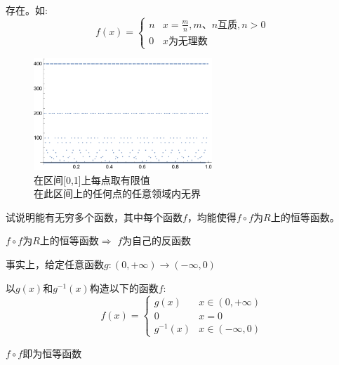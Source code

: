 \begin{solution}
    
    存在。如:
    \begin{equation}
        f(x) = 
        \begin{cases}
            n & x=\frac{m}{n},m\mbox{、}n\mbox{互质},n>0\\ 
            0 & x\mbox{为无理数}
        \end{cases}
    \end{equation}

    \begin{figure}[htbp]
        \centering
        \includegraphics[width=0.6\textwidth]{../image/狄利克雷函数}
        \caption{在区间[0,1]上每点取有限值\\ 在此区间上的任何点的任意领域内无界}
    \end{figure}
\end{solution}

\begin{exercise}
    试说明能有无穷多个函数，其中每个函数$f$，均能使得$f\circ f$为$R$上的恒等函数。
\end{exercise}

\begin{solution}
    
    $f\circ f$为$R$上的恒等函数$\Longrightarrow $ $f$为自己的反函数

    事实上，给定任意函数$g:(0,+\infty) \to (-\infty,0)$

    以$g(x)\mbox{和}g^{-1}(x)$构造以下的函数$f$:
    \begin{equation*}
        f(x)
        = \begin{cases}
            g(x) & x\in (0,+\infty)\\ 
            0 & x=0 \\ 
            g^{-1}(x) & x \in (-\infty,0)
        \end{cases}
    \end{equation*}

    $f\circ f$即为恒等函数
\end{solution}

